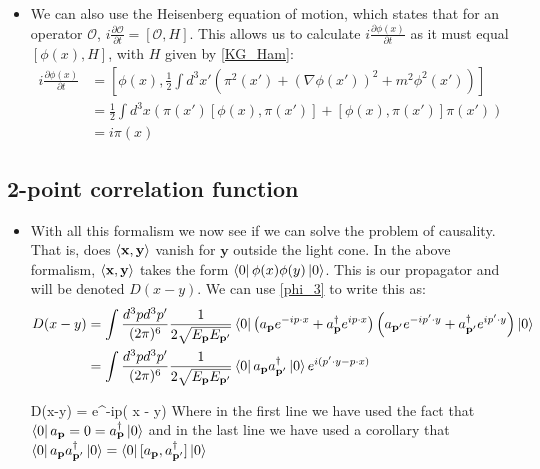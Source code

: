 \documentclass[11pt]{article}
\renewenvironment{flalign}{\vspace{-2mm}\empheq[box=\tcbhighmath]{align}}{\endempheq}
\numberwithin{equation}{section}
\begin{document}
\begin{itemize}
  \item We can also use the Heisenberg equation of motion, which states that for an operator $\mathcal{O}$, $i\frac{\partial \mathcal{O}}{\partial t} = [\mathcal{O},H]$. This allows us to calculate $i\frac{\partial \phi(x)}{\partial t}$ as it must equal $[\phi(x),H]$, with $H$ given by \ref{KG_Ham}:
  \begin{equation*}
  \begin{split}
    i\frac{\partial \phi(x)}{\partial t} & = [\phi(x),\frac{1}{2}\int d^3x'\left(\pi^2(x') +(\nabla\phi(x'))^2+m^2\phi^2(x')\right) ] \\
      & =  \frac{1}{2}\int d^3x \left(\pi(x')[\phi(x), \pi(x')]+[\phi(x), \pi(x')]\pi(x') \right) \\
      & = i \pi(x)
  \end{split}
  \end{equation*}

\end{itemize}
\subsection{2-point correlation function}
\begin{itemize}
  \item  With all this formalism we now see if we can solve the problem of causality. That is, does $\braket{\textbf{x},\textbf{y}}$ vanish for $\textbf{y}$ outside the light cone. In the above formalism, $\braket{\textbf{x},\textbf{y}}$ takes the form $\bra{0}\phi(x)\phi(y)\ket{0}$. This is our propagator and will be denoted $D(x-y)$. We can use \ref{phi_3} to write this as:
  \begin{align*}
   D(x-y) & = \int \frac{d^3pd^3p'}{(2\pi)^6}\frac{1}{2\sqrt{E_{\textbf{p}}E_{\textbf{p}'}}}\bra{0}\left(a_{\textbf{p}}e^{-ip \cdot x}+a^{\dagger}_{\textbf{p}}e^{ip \cdot x}\right)\left(a_{\textbf{p}'}e^{-ip'\cdot y}+a^{\dagger}_{\textbf{p}'}e^{ip' \cdot y}\right)\ket{0}    \\
  & = \int \frac{d^3pd^3p'}{(2\pi)^6}\frac{1}{2\sqrt{E_{\textbf{p}}E_{\textbf{p}'}}}\bra{0}a_{\textbf{p}}a^{\dagger}_{\textbf{p}'}\ket{0}e^{i(p' \cdot y - p \cdot x) } 
  \end{align*}

  \begin{flalign}
  \label{D(x-y)}
  \implies D(x-y) = \int {}e^{-ip\cdot( x - y) }
  \end{flalign}
  Where in the first line we have used the fact that $\bra{0}a_{\textbf{p}} = 0 = a^{\dagger}_{\textbf{p}}\ket{0}$ and in the last line we have used a corollary that $\bra{0}a_{\textbf{p}}a^{\dagger}_{\textbf{p}'}\ket{0}  =\bra{0}[a_{\textbf{p}},a^{\dagger}_{\textbf{p}'}]\ket{0}$
\end{itemize}
\end{document}
